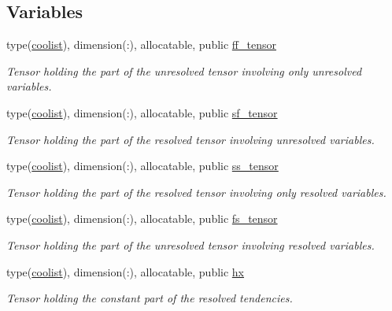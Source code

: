 \subsection*{Variables}
\begin{DoxyCompactItemize}
\item 
type(\hyperlink{structtensor_1_1coolist}{coolist}), dimension(\+:), allocatable, public \hyperlink{namespacedec__tensor_ac70c58053d278b0c95194704a1e48787}{ff\+\_\+tensor}
\begin{DoxyCompactList}\small\item\em Tensor holding the part of the unresolved tensor involving only unresolved variables. \end{DoxyCompactList}\item 
type(\hyperlink{structtensor_1_1coolist}{coolist}), dimension(\+:), allocatable, public \hyperlink{namespacedec__tensor_a3f0627e15eba5158920d63deec399669}{sf\+\_\+tensor}
\begin{DoxyCompactList}\small\item\em Tensor holding the part of the resolved tensor involving unresolved variables. \end{DoxyCompactList}\item 
type(\hyperlink{structtensor_1_1coolist}{coolist}), dimension(\+:), allocatable, public \hyperlink{namespacedec__tensor_a1e5a6c8bbb0cfa7d44245e0567b4ffca}{ss\+\_\+tensor}
\begin{DoxyCompactList}\small\item\em Tensor holding the part of the resolved tensor involving only resolved variables. \end{DoxyCompactList}\item 
type(\hyperlink{structtensor_1_1coolist}{coolist}), dimension(\+:), allocatable, public \hyperlink{namespacedec__tensor_ac3f4574fab9acab6741a1660a49442b9}{fs\+\_\+tensor}
\begin{DoxyCompactList}\small\item\em Tensor holding the part of the unresolved tensor involving resolved variables. \end{DoxyCompactList}\item 
type(\hyperlink{structtensor_1_1coolist}{coolist}), dimension(\+:), allocatable, public \hyperlink{namespacedec__tensor_ac7de63dc4f2ca5ef353c9ee4442e6f78}{hx}
\begin{DoxyCompactList}\small\item\em Tensor holding the constant part of the resolved tendencies. \end{DoxyCompactList}\item 

\end{DoxyCompactItemize}
